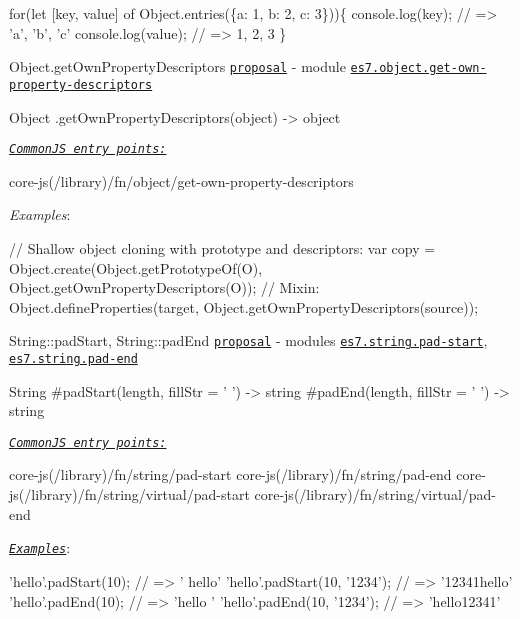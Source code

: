 \begin{DoxyItemize}
\begin{DoxyCode}
for(let [key, value] of Object.entries(\{a: 1, b: 2, c: 3\}))\{
  console.log(key);   // => 'a', 'b', 'c'
  console.log(value); // => 1, 2, 3
\}
\end{DoxyCode}

\item {\ttfamily Object.\+get\+Own\+Property\+Descriptors} \href{https://github.com/tc39/proposal-object-getownpropertydescriptors}{\tt proposal} -\/ module \href{https://github.com/zloirock/core-js/blob/v2.6.0/modules/es7.object.get-own-property-descriptors.js}{\tt {\ttfamily es7.\+object.\+get-\/own-\/property-\/descriptors}} 
\begin{DoxyCode}
Object
  .getOwnPropertyDescriptors(object) -> object
\end{DoxyCode}
 \href{#commonjs}{\tt {\itshape Common\+JS entry points\+:}} 
\begin{DoxyCode}
core-js(/library)/fn/object/get-own-property-descriptors
\end{DoxyCode}
 {\itshape Examples}\+: 
\begin{DoxyCode}
// Shallow object cloning with prototype and descriptors:
var copy = Object.create(Object.getPrototypeOf(O), Object.getOwnPropertyDescriptors(O));
// Mixin:
Object.defineProperties(target, Object.getOwnPropertyDescriptors(source));
\end{DoxyCode}

\item {\ttfamily String\+::pad\+Start}, {\ttfamily String\+::pad\+End} \href{https://github.com/tc39/proposal-string-pad-start-end}{\tt proposal} -\/ modules \href{https://github.com/zloirock/core-js/blob/v2.6.0/modules/es7.string.pad-start.js}{\tt {\ttfamily es7.\+string.\+pad-\/start}}, \href{https://github.com/zloirock/core-js/blob/v2.6.0/modules/es7.string.pad-end.js}{\tt {\ttfamily es7.\+string.\+pad-\/end}} 
\begin{DoxyCode}
String
  #padStart(length, fillStr = ' ') -> string
  #padEnd(length, fillStr = ' ') -> string
\end{DoxyCode}
 \href{#commonjs}{\tt {\itshape Common\+JS entry points\+:}} 
\begin{DoxyCode}
core-js(/library)/fn/string/pad-start
core-js(/library)/fn/string/pad-end
core-js(/library)/fn/string/virtual/pad-start
core-js(/library)/fn/string/virtual/pad-end
\end{DoxyCode}
 \href{http://goo.gl/hK5ccv}{\tt {\itshape Examples}}\+: 
\begin{DoxyCode}
'hello'.padStart(10);         // => '     hello'
'hello'.padStart(10, '1234'); // => '12341hello'
'hello'.padEnd(10);           // => 'hello     '
'hello'.padEnd(10, '1234');   // => 'hello12341'
\end{DoxyCode}


\end{DoxyItemize}
